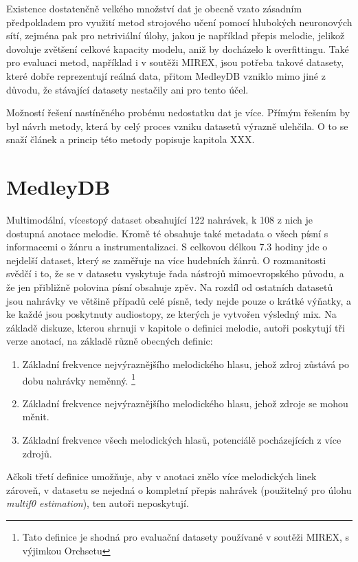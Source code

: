 Existence dostatenčně velkého množství dat je obecně vzato zásadním předpokladem pro využití metod strojového učení pomocí hlubokých neuronových sítí, zejména pak pro netriviální úlohy, jakou je například přepis melodie, jelikož dovoluje zvětšení celkové kapacity modelu, aniž by docházelo k overfittingu. Také pro evaluaci metod, například i v soutěži MIREX, jsou potřeba takové datasety, které dobře reprezentují reálná data, přitom MedleyDB vzniklo mimo jiné z důvodu, že stávající datasety nestačily ani pro tento účel. 

Možností řešení nastíněného probému nedostatku dat je více. Přímým řešením by byl návrh metody, která by celý proces vzniku datasetů výrazně ulehčila. O to se snaží článek \cite{Salamon2017} a princip této metody popisuje kapitola XXX. 

\section{MedleyDB}

\cite{Bittner2014}

Multimodální, vícestopý dataset obsahující 122 nahrávek, k 108 z nich je dostupná anotace melodie. Kromě té obsahuje také metadata o všech písní s informacemi o žánru a instrumentalizaci. S celkovou délkou 7.3 hodiny jde o nejdelší dataset, který se zaměřuje na více hudebních žánrů. O rozmanitosti svědčí i to, že se v datasetu vyskytuje řada nástrojů mimoevropského původu, a že jen přibližně polovina písní obsahuje zpěv. Na rozdíl od ostatních datasetů jsou nahrávky ve většině případů celé písně, tedy nejde pouze o krátké výňatky, a ke každé jsou poskytnuty audiostopy, ze kterých je vytvořen výsledný mix.
Na základě diskuze, kterou shrnuji v kapitole o definici melodie, autoři poskytují tři verze anotací, na základě různě obecných definic:

\begin{enumerate}
    \item Základní frekvence nejvýraznějšího melodického hlasu, jehož zdroj zůstává po dobu nahrávky neměnný. \footnote{Tato definice je shodná pro evaluační datasety používané v soutěži MIREX, s výjimkou Orchsetu}
    \item Základní frekvence nejvýraznějšího melodického hlasu, jehož zdroje se mohou měnit.
    \item Základní frekvence všech melodických hlasů, potenciálě pocházejících z více zdrojů.
\end{enumerate}

Ačkoli třetí definice umožňuje, aby v anotaci znělo více melodických linek zároveň, v datasetu se nejedná o kompletní přepis nahrávek (použitelný pro úlohu \textit{multif0 estimation}), ten autoři neposkytují.

